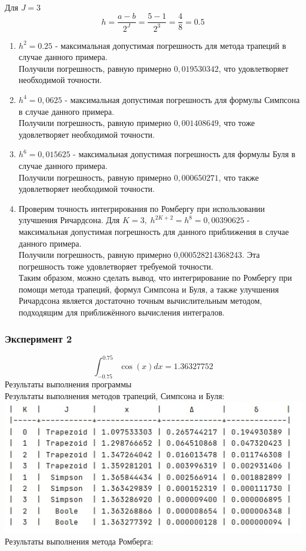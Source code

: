 \documentclass[14pt, titlepage, a4paper]{extarticle} %
\begin{document}
	~\\
	Для $J = 3$
	\[h = \frac{a-b}{2^{J}} = \frac{5-1}{2^{3}} = \frac{4}{8} = 0.5\]
	\begin{enumerate}	
	\item $h^2 = 0.25$ - максимальная допустимая погрешность для метода трапеций в случае данного примера.\\Получили погрешность, равную примерно $0,019530342$, что удовлетворяет необходимой точности.
	\item $h^4 = 0,0625$ - максимальная допустимая погрешность для формулы Симпсона в случае данного примера. \\Получили погрешность, равную примерно $0,001408649$, что тоже удовлетворяет необходимой точности.
	\item $h^6 = 0,015625$ - максимальная допустимая погрешность для формулы Буля в случае данного примера. \\Получили погрешность, равную примерно $0,000650271$, что также удовлетворяет необходимой точности.
	\item Проверим точность интегрирования по Ромбергу при использовании улучшения Ричардсона.
	Для $K = 3,\; h^{2K+2} = h^8 = 0,00390625$ - максимальная допустимая погрешность для данного приближения в случае данного примера. \\Получили погрешность, равную примерно 0,000528214368243. Эта погрешность тоже удовлетворяет требуемой точности.\\
	Таким образом, можно сделать вывод, что интегрирование по Ромбергу при помощи метода трапеций, формул Симпсона и Буля, а также улучшения Ричардсона является достаточно точным вычислительным методом, подходящим для приближённого вычисления интегралов.
	\end{enumerate}
	
	\subsubsection*{Эксперимент 2}
	\[\int_{-0.75}^{0.75}\cos(x)dx = 1.36327752\]
	Результаты выполнения программы
	~\\
	Результаты выполнения методов трапеций, Симпсона и Буля:
	~\\
	
	\includegraphics[width=400pt]{f2.jpeg}
	\\
	Результаты выполнения метода Ромберга:
	~\\
	
\end{document}
